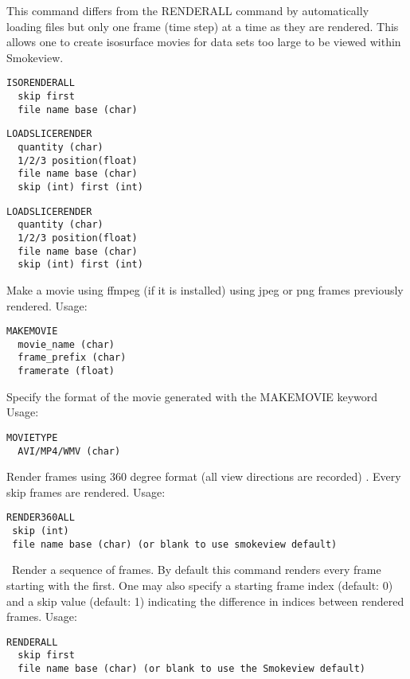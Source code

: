 \documentclass[11pt,twoside]{book}
\begin{document}
This command differs from the RENDERALL command by automatically
loading files but only one  frame (time
step) at a time as they are rendered.  This allows one to create
isosurface movies for data sets too large to be viewed within
Smokeview.

\begin{lstlisting}
ISORENDERALL
  skip first
  file name base (char)
\end{lstlisting}

\begin{lstlisting}
LOADSLICERENDER
  quantity (char)
  1/2/3 position(float)
  file name base (char)
  skip (int) first (int)
\end{lstlisting}

\begin{lstlisting}
LOADSLICERENDER
  quantity (char)
  1/2/3 position(float)
  file name base (char)
  skip (int) first (int)
\end{lstlisting}

Make a movie using ffmpeg (if it is installed) using jpeg or png frames
previously rendered.
Usage:
\begin{lstlisting}
MAKEMOVIE
  movie_name (char)
  frame_prefix (char)
  framerate (float)
\end{lstlisting}

Specify the format of the movie generated with the MAKEMOVIE keyword
Usage:
\begin{lstlisting}
MOVIETYPE
  AVI/MP4/WMV (char)
\end{lstlisting}

Render frames using 360 degree format (all view directions are recorded) .
Every skip frames are rendered.  Usage:
\begin{lstlisting}
RENDER360ALL
 skip (int)
 file name base (char) (or blank to use smokeview default)
\end{lstlisting}

\ Render a sequence of frames.  By default this
command renders every frame starting with the first. One may also
specify a starting frame index (default: 0) and a skip value
(default: 1) indicating the difference in indices between rendered
frames. Usage:
\begin{lstlisting}
RENDERALL
  skip first
  file name base (char) (or blank to use the Smokeview default)
\end{lstlisting}
\end{document}
